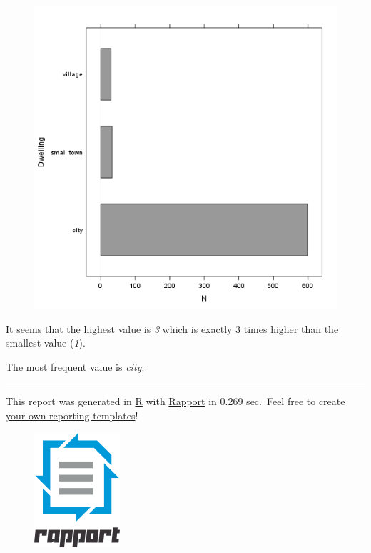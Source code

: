 \documentclass[]{article}
\makeatletter
\def\maxwidth{\ifdim\Gin@nat@width>\linewidth\linewidth
\else\Gin@nat@width\fi}
\let\Oldincludegraphics\includegraphics
\renewcommand{\includegraphics}[1]{\Oldincludegraphics[width=\maxwidth]{#1}}
\makeatother
\begin{document}
\begin{figure}[htbp]
\centering
\includegraphics{56568b0b0cecf2de13fbe0316f43f8fc.png}
\caption{}
\end{figure}

It seems that the highest value is \emph{3} which is exactly 3 times
higher than the smallest value (\emph{1}).

The most frequent value is \emph{city}.

\begin{center}\rule{3in}{0.4pt}\end{center}

This report was generated in \href{http://www.r-project.org/}{R} with
\href{http://al3xa.github.com/rapport/}{Rapport} in 0.269 sec.~Feel free
to create \href{http://al3xa.github.com/rapport/#custom}{your own
reporting templates}!

\begin{figure}[htbp]
\centering
\includegraphics{images/rapport.png}
\caption{}
\end{figure}
\end{document}
